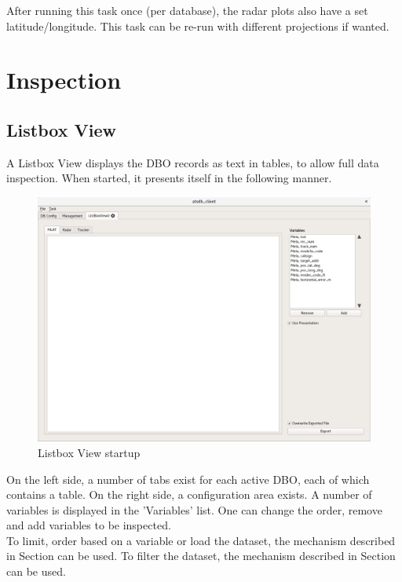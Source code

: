 \documentclass[10pt,letterpaper,extrafontsizes]{memoir}
\begin{document}
After running this task once (per database), the radar plots also have a set latitude/longitude. This task can be re-run with different projections if wanted.

\section{Inspection}
\label{sec:inspection}

\subsection{Listbox View}
\label{sec:listbox_view}
A Listbox View displays the DBO records as text in tables, to allow full data inspection. When started, it presents itself in the following manner.

\begin{figure}[H]
    \hspace*{-2cm}
    \includegraphics[width=18cm]{../screenshots/listbox_start.png}
  \caption{Listbox View startup}
  \label{fig:listbox_start}
\end{figure}

On the left side, a number of tabs exist for each active DBO, each of which contains a table. On the right side, a configuration area exists. A number of variables is displayed in the 'Variables' list. One can change the order, remove and add variables to be inspected. \\

To limit, order based on a variable or load the dataset, the mechanism described in Section  can be used. To filter the dataset, the mechanism described in Section  can be used.
\end{document}
